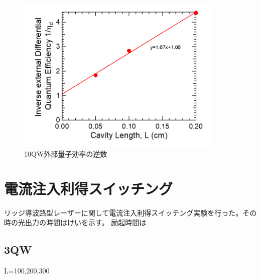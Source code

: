 \begin{figure}[htbp]
	\centering
	\includegraphics[width=10cm]{figure/fig_3_1_10QW_broadcontact_id_inverse.png}
	\caption{10QW外部量子効率の逆数}
	\label{fig:fig_3_1_10QW_broadcontact_id_inverse}
\end{figure}

\newpage
\newpage
\newpage
\section{電流注入利得スイッチング}%
リッジ導波路型レーザーに関して電流注入利得スイッチング実験を行った。その時の光出力の時間はけいを示す。
励起時間は

\subsection{3QW}%
L=100,200,300

